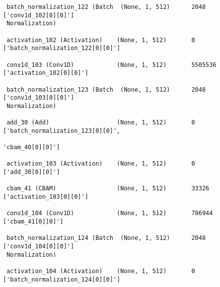 \begin{lstlisting}
 batch_normalization_122 (Batch  (None, 1, 512)      2048        ['conv1d_102[0][0]']             
 Normalization)                                                                                   
                                                                                                  
 activation_102 (Activation)    (None, 1, 512)       0           ['batch_normalization_122[0][0]']
                                                                                                  
 conv1d_103 (Conv1D)            (None, 1, 512)       5505536     ['activation_102[0][0]']         
                                                                                                  
 batch_normalization_123 (Batch  (None, 1, 512)      2048        ['conv1d_103[0][0]']             
 Normalization)                                                                                   
                                                                                                  
 add_30 (Add)                   (None, 1, 512)       0           ['batch_normalization_123[0][0]',
                                                                  'cbam_40[0][0]']                
                                                                                                  
 activation_103 (Activation)    (None, 1, 512)       0           ['add_30[0][0]']                 
                                                                                                  
 cbam_41 (CBAM)                 (None, 1, 512)       33326       ['activation_103[0][0]']         
                                                                                                  
 conv1d_104 (Conv1D)            (None, 1, 512)       786944      ['cbam_41[0][0]']                
                                                                                                  
 batch_normalization_124 (Batch  (None, 1, 512)      2048        ['conv1d_104[0][0]']             
 Normalization)                                                                                   
                                                                                                  
 activation_104 (Activation)    (None, 1, 512)       0           ['batch_normalization_124[0][0]']
                                                                                                  

\end{lstlisting}
